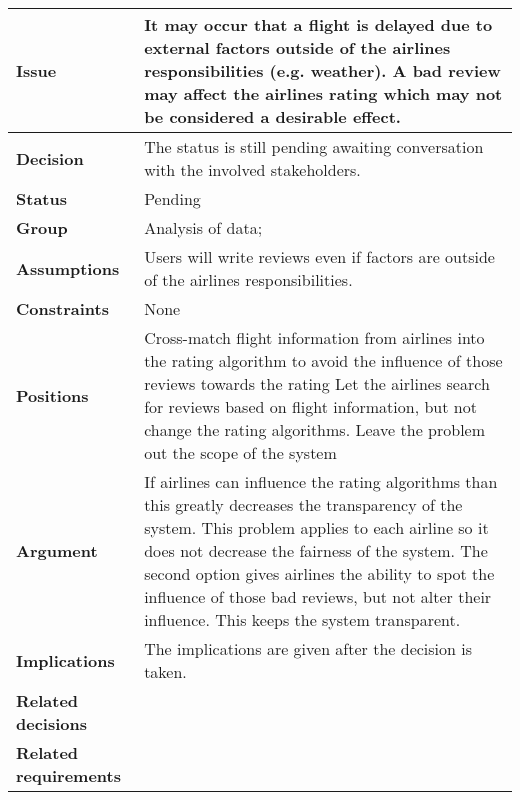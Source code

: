 
\begin{tabular}{ l  p{10cm}}
\hline
\bf Issue & It may occur that a flight is delayed due to external factors outside of the airlines responsibilities (e.g. weather). A bad review may affect the airlines rating which may not be considered a desirable effect.\\
\hline
\bf Decision & The status is still pending awaiting conversation with the involved stakeholders.\\
\hline
\bf Status & Pending\\
\hline
\bf Group & Analysis of data; \\
\hline
\bf Assumptions & Users will write reviews even if factors are outside of the airlines responsibilities.\\
\hline
\bf Constraints & None \\
\hline
\bf Positions & Cross-match flight information from airlines into the rating algorithm to avoid the influence of those reviews towards the rating \newline\newline
Let the airlines search for reviews based on flight information, but not change the rating algorithms. \newline\newline
Leave the problem out the scope of the system 
\\
\hline
\bf Argument & If airlines can influence the rating algorithms than this greatly decreases the transparency of the system. This problem applies to each airline so it does not decrease the fairness of the system. The second option gives airlines the ability to spot the influence of those bad reviews, but not alter their influence. This keeps the system transparent. \\
\hline
\bf Implications &The implications are given after the decision is taken.  \\
\hline
\bf Related decisions & \\
\hline
\bf Related requirements  & \\
\hline
\end{tabular}

